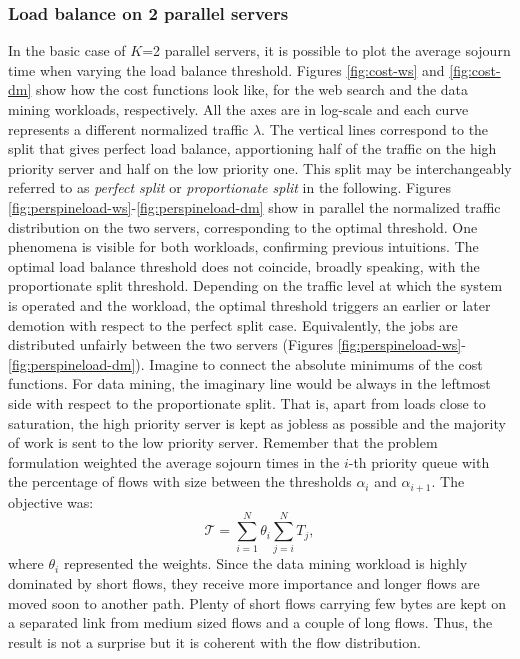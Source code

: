 \subsubsection{Load balance on 2 parallel servers}
\label{sec:load-balance-2-servers}
In the basic case of $K$=2 parallel servers, it is possible to plot the average sojourn time when varying the load balance threshold. Figures \ref{fig:cost-ws} and \ref{fig:cost-dm} show how the cost functions look like, for the web search and the data mining workloads, respectively. All the axes are in log-scale and each curve represents a different normalized traffic $\lambda$. The vertical lines correspond to the split that gives perfect load balance, apportioning half of the traffic on the high priority server and half on the low priority one. This split may be interchangeably referred to as \emph{perfect split} or \emph{proportionate split} in the following. Figures \ref{fig:perspineload-ws}-\ref{fig:perspineload-dm} show in parallel the normalized traffic distribution on the two servers, corresponding to the optimal threshold. One phenomena is visible for both workloads, confirming previous intuitions. The optimal load balance threshold does not coincide, broadly speaking, with the proportionate split threshold. Depending on the traffic level at which the system is operated and the workload, the optimal threshold triggers an earlier or later demotion with respect to the perfect split case. Equivalently, the jobs are distributed unfairly between the two servers (Figures \ref{fig:perspineload-ws}-\ref{fig:perspineload-dm}). Imagine to connect the absolute minimums of the cost functions. For data mining, the imaginary line would be always in the leftmost side with respect to the proportionate split. That is, apart from loads close to saturation, the high priority server is kept as jobless as possible and the majority of work is sent to the low priority server. Remember that the problem formulation weighted the average sojourn times in the $i$-th priority queue with the percentage of flows with size between the thresholds $\alpha_{i}$ and $\alpha_{i+1}$. The objective was:
\[
\mathcal{T} = \sum_{i=1}^{N}\theta_i \sum_{j=i}^{N}T_j,
\]
where $\theta_i$ represented the weights. Since the data mining workload is highly dominated by short flows, they receive more importance and longer flows are moved soon to another path. Plenty of short flows carrying few bytes are kept on a separated link from medium sized flows and a couple of long flows. Thus, the result is not a surprise but it is coherent with the flow distribution. \\
